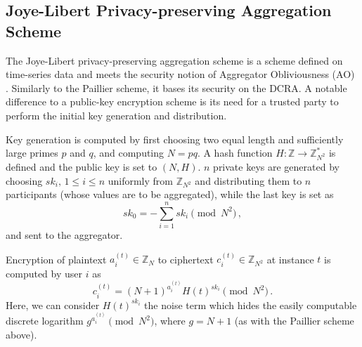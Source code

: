 \documentclass[10pt,letterpaper,oneside,twocolumn,journal]{IEEEtran}
\theoremstyle{definition}
\theoremstyle{definition}
\theoremstyle{remark}
\begin{document}
% 
% 

\subsection{Joye-Libert Privacy-preserving Aggregation Scheme} \label{subsec:joye_libert_scheme}
The Joye-Libert privacy-preserving aggregation scheme \cite{joyeScalableSchemePrivacyPreserving2013} is a scheme defined on time-series data and meets the security notion of Aggregator Obliviousness (AO) \cite{shiPrivacyPreservingAggregationTimeSeries2011}. Similarly to the Paillier scheme, it bases its security on the DCRA. A notable difference to a public-key encryption scheme is its need for a trusted party to perform the initial key generation and distribution.

Key generation is computed by first choosing two equal length and sufficiently large primes $p$ and $q$, and computing $N=pq$. A hash function $H:\mathbb{Z} \rightarrow \mathbb{Z}_{N^2}^*$ is defined and the public key is set to $(N, H)$. $n$ private keys are generated by choosing $sk_i,\,1\leq i\leq n$ uniformly from $\mathbb{Z}_{N^2}$ and distributing them to $n$ participants (whose values are to be aggregated), while the last key is set as
\begin{equation}
    sk_0 = -\sum^{n}_{i=1}sk_i \pmod{N^2}\,,
\end{equation}
and sent to the aggregator.

Encryption of plaintext $a^{(t)}_{i} \in \mathbb{Z}_N$ to ciphertext $c^{(t)}_{i} \in \mathbb{Z}_{N^2}$ at instance $t$ is computed by user $i$ as
\begin{equation}
    c^{(t)}_{i} = (N+1)^{a^{(t)}_{i}} H(t)^{sk_i} \pmod{N^2}\,.
\end{equation}
Here, we can consider $H(t)^{sk_i}$ the noise term which hides the easily computable discrete logarithm $g^{a^{(t)}_{i}} \pmod{N^2}$, where $g=N+1$ (as with the Paillier scheme above).
\end{document}
